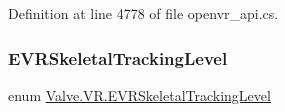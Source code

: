 Definition at line 4778 of file openvr\+\_\+api.\+cs.

\mbox{\label{namespace_valve_1_1_v_r_a6f46bd50fb65255d6537ab32a6bddc30}} 
\subsubsection{\texorpdfstring{EVRSkeletalTrackingLevel}{EVRSkeletalTrackingLevel}}
{\footnotesize\ttfamily enum \mbox{\hyperlink{namespace_valve_1_1_v_r_a6f46bd50fb65255d6537ab32a6bddc30}{Valve.\+V\+R.\+E\+V\+R\+Skeletal\+Tracking\+Level}}\hspace{0.3cm}{\ttfamily [strong]}}


